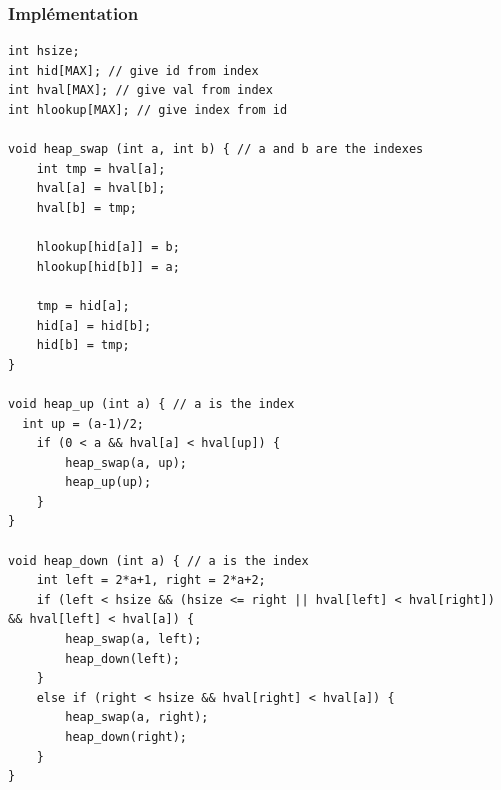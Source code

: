 \documentclass[10pt,svgnames,usenames,table]{beamer} %
\begin{document}
\begin{frame}[allowframebreaks]
  \framebreak
  \begin{center}
  \end{center}
  \framebreak
  \begin{center}
  \end{center}
  \framebreak
  \begin{center}
  \end{center}
\end{frame}
\begin{frame}
  \frametitle{Implémentation}
  \begin{lstlisting}
int hsize;
int hid[MAX]; // give id from index
int hval[MAX]; // give val from index
int hlookup[MAX]; // give index from id

void heap_swap (int a, int b) { // a and b are the indexes
	int tmp = hval[a];
	hval[a] = hval[b];
	hval[b] = tmp;

	hlookup[hid[a]] = b;
	hlookup[hid[b]] = a;

	tmp = hid[a];
	hid[a] = hid[b];
	hid[b] = tmp;
}

void heap_up (int a) { // a is the index
  int up = (a-1)/2;
	if (0 < a && hval[a] < hval[up]) {
		heap_swap(a, up);
		heap_up(up);
	}
}

void heap_down (int a) { // a is the index
	int left = 2*a+1, right = 2*a+2;
	if (left < hsize && (hsize <= right || hval[left] < hval[right]) && hval[left] < hval[a]) {
		heap_swap(a, left);
		heap_down(left);
	}
	else if (right < hsize && hval[right] < hval[a]) {
		heap_swap(a, right);
		heap_down(right);
	}
}
  \end{lstlisting}
\end{frame}
\end{document}
